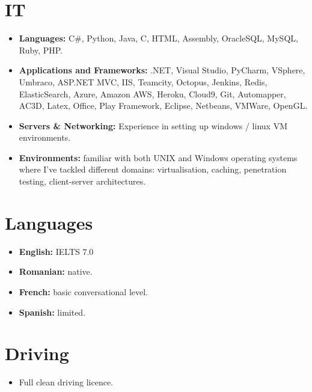 \documentclass[12pt,a4paper]{res}
\begin{document}
\begin{resume}
\section{IT}
\vspace{-1mm}
  \begin{itemize}

  \item[] {\bf Languages:} C\#, Python, Java, C, HTML, Assembly, OracleSQL, MySQL, Ruby, PHP.
  \item[] {\bf Applications and Frameworks:} .NET, Visual Studio, PyCharm, VSphere, Umbraco, ASP.NET MVC, IIS, Teamcity, Octopus, Jenkins, Redis, ElasticSearch, Azure, Amazon AWS, Heroku, Cloud9, Git, Automapper, AC3D, Latex, Office, Play Framework, Eclipse, Netbeans, VMWare, OpenGL.
  \item[] {\bf Servers \& Networking:} Experience in setting up windows / linux VM environments.
  \item[] {\bf Environments:} familiar with both UNIX and Windows operating systems where I've tackled different domains: virtualisation, caching, penetration testing, client-server architectures.
  \end{itemize}
\vspace{-3mm}
      
    
\section{Languages}
\vspace{-0.7mm}
\begin{itemize}
\item[] {\bf English:} IELTS 7.0
\item[] {\bf Romanian:} native.
\item[] {\bf French:} basic conversational level.
\item[] {\bf Spanish:} limited. 
\end{itemize}
\vspace{-3mm}

\section{Driving}
\vspace{-0.7mm}
\begin{itemize}
\item[] Full clean driving licence.
\end{itemize}
  \vspace{-3mm}
  
\end{resume}
\end{document}
